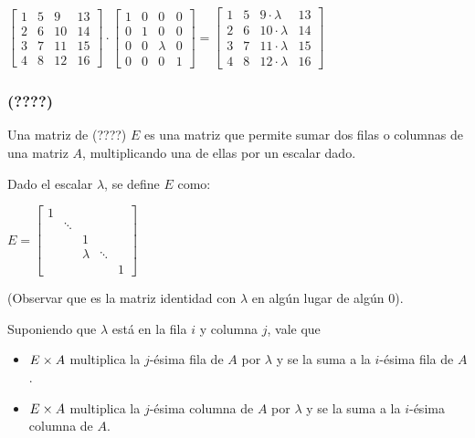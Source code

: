 \documentclass[]{article}
\begin{document}
\begin{center}
	$\begin{bmatrix}
		1&5&9&13 \\
		2&6&10&14 \\
		3&7&11&15 \\
		4&8&12&16
	\end{bmatrix} \cdot
	\begin{bmatrix}
			1&0&0&0 \\
			0&1&0&0 \\
			0&0&\lambda&0 \\
			0&0&0&1
		\end{bmatrix} =
	\begin{bmatrix}
		1&5&9\cdot\lambda&13 \\
		2&6&10\cdot\lambda&14 \\
		3&7&11\cdot\lambda&15 \\
		4&8&12\cdot\lambda&16
	\end{bmatrix}
	$
\end{center}


\subsubsection{(????)}
Una matriz de (????) $E$ es una matriz que permite sumar dos filas o columnas de una matriz $A$, multiplicando una de ellas por un escalar dado.

Dado el escalar $\lambda$, se define $E$ como:
\begin{center}
	$E = \begin{bmatrix}
		1 & & & & \\
		& \ddots & & & \\
		& & 1 & & \\
		& & \lambda & \ddots & \\
		& & & & 1
	\end{bmatrix}$
\end{center}

(Observar que es la matriz identidad con $\lambda$ en algún lugar de algún $0$).

Suponiendo que $\lambda$ está en la fila $i$ y columna $j$, vale que
\begin{itemize}
	\item $E \times A$ multiplica la $j$-ésima fila de $A$ por $\lambda$ y se la suma a la $i$-ésima fila de $A$.
	\item $E \times A$ multiplica la $j$-ésima columna de $A$ por $\lambda$ y se la suma a la $i$-ésima columna de $A$.
\end{itemize}
\end{document}
